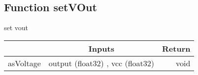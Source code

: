 \documentclass[a4paper,12pt,oneside,pdflatex,italian,final,twocolumn]{article}
\begin{document}
\raggedright
\subsection{Function setVOut }
set vout \\

\centering
\begin{tabular}{lcr}
\toprule
  & Inputs & Return \\
\midrule
asVoltage &
output (float32)
, 
vcc (float32)

&
void
\\
\bottomrule
\end{tabular}



\raggedright
\end{document}
